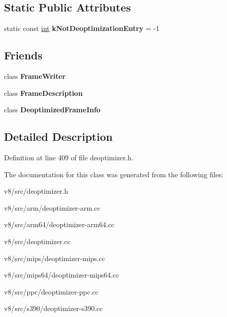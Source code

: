 \subsection*{Static Public Attributes}
\begin{DoxyCompactItemize}
\item 
\mbox{\label{classv8_1_1internal_1_1Deoptimizer_a670edfccf46146bdfbb870239c84f0a9}} 
static const \mbox{\hyperlink{classint}{int}} {\bfseries k\+Not\+Deoptimization\+Entry} = -\/1
\end{DoxyCompactItemize}
\subsection*{Friends}
\begin{DoxyCompactItemize}
\item 
\mbox{\label{classv8_1_1internal_1_1Deoptimizer_aff6aeca06ec3fdfaa59793a0bbbf8010}} 
class {\bfseries Frame\+Writer}
\item 
\mbox{\label{classv8_1_1internal_1_1Deoptimizer_a224be72dc184a8c14bfe381aba312774}} 
class {\bfseries Frame\+Description}
\item 
\mbox{\label{classv8_1_1internal_1_1Deoptimizer_ad768f50809f35947f37316cdfe284e92}} 
class {\bfseries Deoptimized\+Frame\+Info}
\end{DoxyCompactItemize}


\subsection{Detailed Description}


Definition at line 409 of file deoptimizer.\+h.



The documentation for this class was generated from the following files\+:\begin{DoxyCompactItemize}
\item 
v8/src/deoptimizer.\+h\item 
v8/src/arm/deoptimizer-\/arm.\+cc\item 
v8/src/arm64/deoptimizer-\/arm64.\+cc\item 
v8/src/deoptimizer.\+cc\item 
v8/src/mips/deoptimizer-\/mips.\+cc\item 
v8/src/mips64/deoptimizer-\/mips64.\+cc\item 
v8/src/ppc/deoptimizer-\/ppc.\+cc\item 
v8/src/s390/deoptimizer-\/s390.\+cc\end{DoxyCompactItemize}
